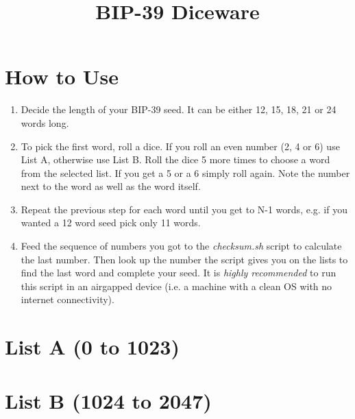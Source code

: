 \documentclass{article}
\title{BIP-39 Diceware}
\author{}
\date{}
\begin{document}
\maketitle

\section*{How to Use}

\begin{enumerate}
\item Decide the length of your BIP-39 seed. It can be either 12, 15, 18, 21 or 24 words long.
\item To pick the first word, roll a dice. If you roll an even number (2, 4 or 6) use List A, otherwise use List B.
Roll the dice 5 more times to choose a word from the selected list. If you get a 5 or a 6 simply roll again.
Note the number next to the word as well as the word itself.
\item Repeat the previous step for each word until you get to N-1 words, e.g. if you wanted a 12 word seed pick only 11 words.
\item Feed the sequence of numbers you got to the \emph{checksum.sh} script to calculate the last number.
Then look up the number the script gives you on the lists to find the last word and complete your seed.
It is \emph{highly recommended} to run this script in an airgapped device (i.e. a machine with a clean OS with no internet connectivity).
\end{enumerate}

\section*{List A (0 to 1023)}
\begin{multicols}{4}
\begin{small}

\end{small}
\end{multicols}

\clearpage

\section*{List B (1024 to 2047)}
\begin{multicols}{4}
\begin{small}

\end{small}
\end{multicols}
\end{document}

